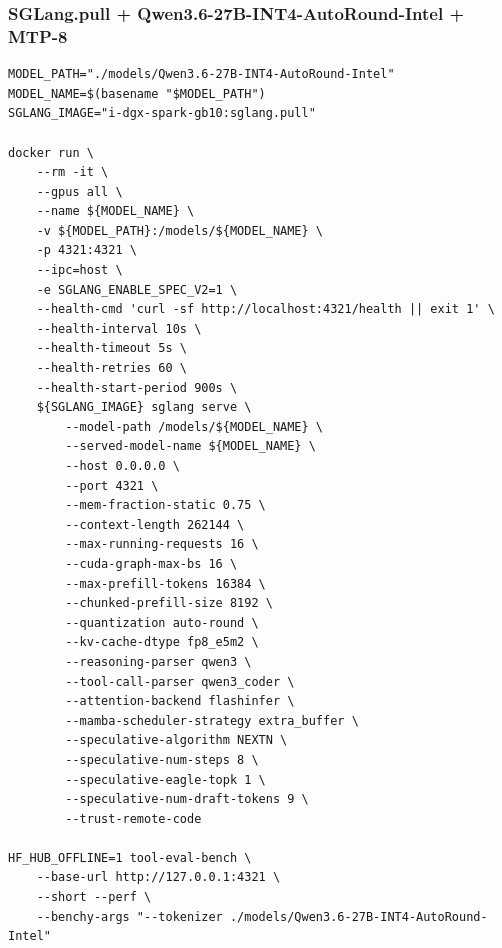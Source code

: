 \documentclass{article}
\begin{document}
\subsubsection{SGLang.pull + Qwen3.6-27B-INT4-AutoRound-Intel + MTP-8}
\begin{lstlisting}
MODEL_PATH="./models/Qwen3.6-27B-INT4-AutoRound-Intel"
MODEL_NAME=$(basename "$MODEL_PATH")
SGLANG_IMAGE="i-dgx-spark-gb10:sglang.pull"

docker run \
    --rm -it \
    --gpus all \
    --name ${MODEL_NAME} \
    -v ${MODEL_PATH}:/models/${MODEL_NAME} \
    -p 4321:4321 \
    --ipc=host \
    -e SGLANG_ENABLE_SPEC_V2=1 \
    --health-cmd 'curl -sf http://localhost:4321/health || exit 1' \
    --health-interval 10s \
    --health-timeout 5s \
    --health-retries 60 \
    --health-start-period 900s \
    ${SGLANG_IMAGE} sglang serve \
        --model-path /models/${MODEL_NAME} \
        --served-model-name ${MODEL_NAME} \
        --host 0.0.0.0 \
        --port 4321 \
        --mem-fraction-static 0.75 \
        --context-length 262144 \
        --max-running-requests 16 \
        --cuda-graph-max-bs 16 \
        --max-prefill-tokens 16384 \
        --chunked-prefill-size 8192 \
        --quantization auto-round \
        --kv-cache-dtype fp8_e5m2 \
        --reasoning-parser qwen3 \
        --tool-call-parser qwen3_coder \
        --attention-backend flashinfer \
        --mamba-scheduler-strategy extra_buffer \
        --speculative-algorithm NEXTN \
        --speculative-num-steps 8 \
        --speculative-eagle-topk 1 \
        --speculative-num-draft-tokens 9 \
        --trust-remote-code

HF_HUB_OFFLINE=1 tool-eval-bench \
    --base-url http://127.0.0.1:4321 \
    --short --perf \
    --benchy-args "--tokenizer ./models/Qwen3.6-27B-INT4-AutoRound-Intel"
\end{lstlisting}
\end{document}

